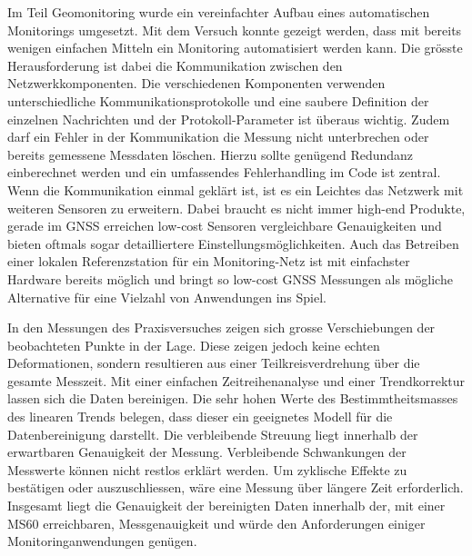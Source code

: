 Im Teil Geomonitoring wurde ein vereinfachter Aufbau eines automatischen Monitorings umgesetzt. Mit dem Versuch konnte gezeigt 
werden, dass mit bereits wenigen einfachen Mitteln ein Monitoring automatisiert werden kann. Die grösste Herausforderung 
ist dabei die Kommunikation zwischen den Netzwerkkomponenten. Die verschiedenen Komponenten verwenden unterschiedliche 
Kommunikationsprotokolle und eine saubere Definition der einzelnen Nachrichten und der Protokoll-Parameter ist überaus wichtig. 
Zudem darf ein Fehler in der Kommunikation die Messung nicht unterbrechen oder bereits gemessene Messdaten löschen. Hierzu sollte 
genügend Redundanz einberechnet werden und ein umfassendes Fehlerhandling im Code ist zentral. Wenn die Kommunikation einmal geklärt 
ist, ist es ein Leichtes das Netzwerk mit weiteren Sensoren zu erweitern. Dabei braucht es nicht immer high-end Produkte, gerade 
im GNSS erreichen low-cost Sensoren vergleichbare Genauigkeiten und bieten oftmals sogar detailliertere Einstellungsmöglichkeiten. 
Auch das Betreiben einer lokalen Referenzstation für ein Monitoring-Netz ist mit einfachster Hardware bereits möglich und 
bringt so low-cost GNSS Messungen als mögliche Alternative für eine Vielzahl von Anwendungen ins Spiel.

In den Messungen des Praxisversuches zeigen sich grosse Verschiebungen der beobachteten Punkte in der Lage. 
Diese zeigen jedoch keine echten Deformationen, sondern resultieren aus einer Teilkreisverdrehung über die gesamte Messzeit. Mit einer 
einfachen Zeitreihenanalyse und einer Trendkorrektur lassen sich die Daten bereinigen. Die sehr hohen Werte des 
Bestimmtheitsmasses des linearen Trends belegen, dass dieser ein geeignetes Modell für die Datenbereinigung darstellt. Die verbleibende 
Streuung liegt innerhalb der erwartbaren Genauigkeit der Messung. Verbleibende Schwankungen der Messwerte können nicht restlos 
erklärt werden. Um zyklische Effekte zu bestätigen oder auszuschliessen, wäre eine Messung über längere Zeit erforderlich. Insgesamt 
liegt die Genauigkeit der bereinigten Daten innerhalb der, mit einer MS60 erreichbaren, Messgenauigkeit und würde den Anforderungen einiger 
Monitoringanwendungen genügen. 